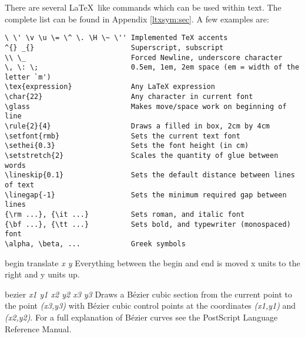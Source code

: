 \begin{commanddescription}
  
  
  
  
 \index{\LaTeX} There are several \LaTeX \ like commands which can be used within text. The complete list can be found in Appendix \ref{ltxsym:sec}. A few examples are:

\begin{Verbatim}
\ \' \v \u \= \^ \. \H \~ \'' Implemented TeX accents
^{} _{}                       Superscript, subscript
\\ \_                         Forced Newline, underscore character
\, \: \;                      0.5em, 1em, 2em space (em = width of the letter `m')
\tex{expression}              Any LaTeX expression
\char{22}                     Any character in current font
\glass                        Makes move/space work on beginning of line
\rule{2}{4}                   Draws a filled in box, 2cm by 4cm
\setfont{rmb}                 Sets the current text font
\sethei{0.3}                  Sets the font height (in cm)
\setstretch{2}                Scales the quantity of glue between words
\lineskip{0.1}                Sets the default distance between lines of text
\linegap{-1}                  Sets the minimum required gap between lines
{\rm ...}, {\it ...}          Sets roman, and italic font
{\bf ...}, {\tt ...}          Sets bold, and typewriter (monospaced) font
\alpha, \beta, ...            Greek symbols
\end{Verbatim}

\item[{\sf begin translate {\it x y}}]
 Everything between the {\sf begin} and {\sf end} is moved
x units to the right and y units up.

\item[{\sf bezier {\it x1 y1 x2 y2 x3 y3}}]
Draws a B\'{e}zier cubic section from the current point to the point
{\it (x3,y3)} with B\'{e}zier cubic control points at the coordinates
{\it (x1,y1)} and {\it (x2,y2)}.  For a full explanation of B\'{e}zier curves
see the PostScript Language Reference Manual.



\end{commanddescription}
